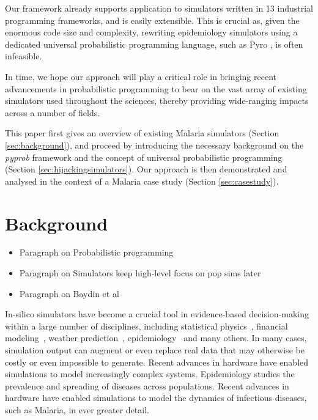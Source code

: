 \documentclass{article}
\begin{document}
Our framework already supports application to simulators written in 13 industrial programming frameworks, and is easily extensible. This is crucial as, given the enormous code size and complexity, rewriting epidemiology simulators using a dedicated universal probabilistic programming language, such as Pyro \cite{bingham2019pyro}, is often infeasible.

In time, we hope our approach will play a critical role in
bringing recent advancements in probabilistic programming to bear on
the vast array of existing simulators used throughout the sciences,
thereby providing wide-ranging impacts across a number of fields.

This paper first gives an overview of existing Malaria simulators (Section \ref{sec:background}), and proceed by introducing the necessary background on the \textit{pyprob} framework and the concept of universal probabilistic programming (Section \ref{sec:hijackingsimulators}). Our approach is then demonstrated and analysed in the context of a Malaria case study (Section \ref{sec:casestudy}). 

\section{Background}
\label{sec:backgorund}

\begin{itemize}
\item Paragraph on Probabilistic programming
\item Paragraph on Simulators keep high-level focus on pop sims later
\item Paragraph on Baydin et al
\end{itemize}
In-silico simulators have become a crucial tool in evidence-based decision-making within a large number of disciplines, including statistical physics~\cite{landau_binder_2014}, financial modeling~\cite{jackel2002monte},
weather prediction~\cite{evensen1994sequential}, epidemiology~\cite{smith2008towards} and many others.
In many cases, simulation output can augment or even replace real data that may otherwise be costly or even impossible to generate.
Recent advances in hardware have enabled simulations to model increasingly complex systems.
Epidemiology studies the prevalence and spreading of diseases across populations. Recent advances in hardware have enabled simulations to model the dynamics of infectious diseases, such as Malaria, in ever greater detail.
\end{document}
